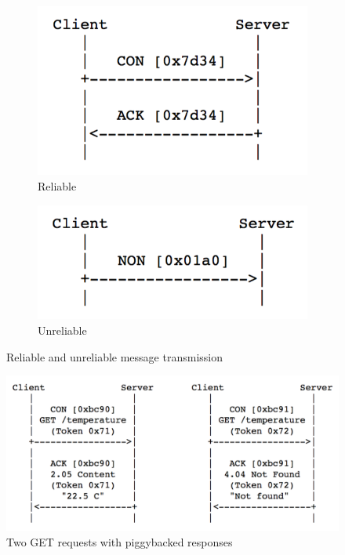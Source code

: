 \begin{figure}[!htbp]
\begin{subfigure}[t]{.5\textwidth}
  \centering
  \includegraphics[scale = 0.55]{reliable_msg_trans.png}
  \caption{Reliable}
  \label{fig:reliable_msg_trans}
\end{subfigure}%
\begin{subfigure}[t]{.5\textwidth}
  \centering
  \includegraphics[scale = 0.55]{unreliable_msg_trans.png}
  \caption{Unreliable}
  \label{fig:unreliable_msg_trans}
\end{subfigure}
\caption{Reliable and unreliable message transmission}
\end{figure}

\begin{figure}[!htbp]
\centering
\includegraphics[scale = 0.55]{get_example.png}
\caption{Two GET requests with piggybacked responses}
\label{fig:get_example}
\end{figure}

